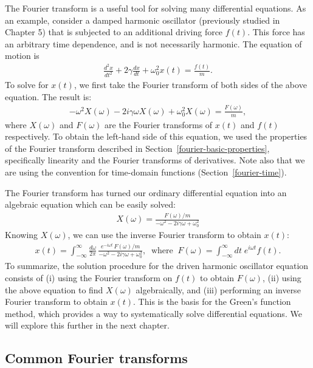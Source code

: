 \documentclass[10pt,a4paper]{article}
\begin{document}
The Fourier transform is a useful tool for solving many differential
equations.  As an example, consider a damped harmonic oscillator
(previously studied in Chapter 5) that is subjected to an additional
driving force $f(t)$.  This force has an arbitrary time dependence,
and is not necessarily harmonic.  The equation of motion is
\begin{align}
  \frac{d^2 x}{dt^2} + 2\gamma \frac{dx}{dt} + \omega_0^2 x(t) = \frac{f(t)}{m}.
\end{align}
To solve for $x(t)$, we first take the Fourier transform of both sides
of the above equation.  The result is:
\begin{align}
  - \omega^2 X(\omega) - 2 i\gamma \omega X(\omega) + \omega_0^2 X(\omega) = \frac{F(\omega)}{m},
\end{align}
where $X(\omega)$ and $F(\omega)$ are the Fourier transforms of $x(t)$
and $f(t)$ respectively. To obtain the left-hand side of this
equation, we used the properties of the Fourier transform described in
Section~\ref{fourier-basic-properties}, specifically linearity and the
Fourier transforms of derivatives.  Note also that we are using the
convention for time-domain functions (Section~\ref{fourier-time}).

The Fourier transform has turned our ordinary differential equation
into an algebraic equation which can be easily solved:
\begin{align}
  X(\omega) = \frac{F(\omega)/m}{- \omega^2 - 2 i\gamma \omega + \omega_0^2}
\end{align}
Knowing $X(\omega)$, we can use the inverse Fourier transform to
obtain $x(t)$:
\begin{align}
  x(t) = \int_{-\infty}^\infty \frac{d\omega}{2\pi} \, \frac{e^{-i\omega t}\, F(\omega)/m}{- \omega^2 - 2 i\gamma \omega + \omega_0^2}, \;\; \mathrm{where}\;\; F(\omega) = \int_{-\infty}^\infty dt\; e^{i\omega t} f(t).
\end{align}
To summarize, the solution procedure for the driven harmonic
oscillator equation consists of (i) using the Fourier transform on
$f(t)$ to obtain $F(\omega)$, (ii) using the above equation to find
$X(\omega)$ algebraically, and (iii) performing an inverse Fourier
transform to obtain $x(t)$.  This is the basis for the Green's
function method, which provides a way to systematically solve
differential equations. We will explore this further in the next
chapter.

\subsection{Common Fourier transforms}
\label{common-fourier-transforms}
\end{document}

